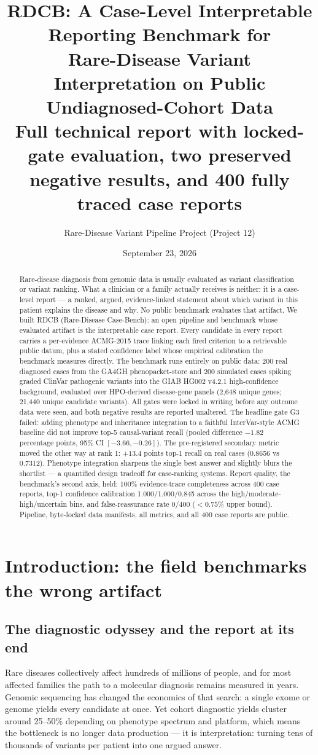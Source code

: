 \documentclass[11pt]{article}
\title{\textbf{RDCB: A Case-Level Interpretable Reporting Benchmark for\\Rare-Disease Variant Interpretation on Public Undiagnosed-Cohort Data}\\[0.4em]
\large Full technical report with locked-gate evaluation, two preserved negative results, and 400 fully traced case reports}
\author{Rare-Disease Variant Pipeline Project (Project 12)}
\date{September 23, 2026}
\begin{document}
\maketitle
\begin{abstract}
Rare-disease diagnosis from genomic data is usually evaluated as variant
classification or variant ranking. What a clinician or a family actually receives is
neither: it is a case-level report --- a ranked, argued, evidence-linked statement
about which variant in this patient explains the disease and why. No public benchmark
evaluates that artifact. We built RDCB (Rare-Disease Case-Bench): an open pipeline and
benchmark whose evaluated artifact is the interpretable case report. Every candidate
in every report carries a per-evidence ACMG-2015 trace linking each fired criterion to
a retrievable public datum, plus a stated confidence label whose empirical calibration
the benchmark measures directly. The benchmark runs entirely on public data: 200 real diagnosed cases from
the GA4GH phenopacket-store and 200 simulated cases spiking graded ClinVar pathogenic
variants into the GIAB HG002 v4.2.1 high-confidence background, evaluated over
HPO-derived disease-gene panels (2,648 unique genes; 21,440 unique candidate
variants). All gates were locked in writing before any outcome data were seen, and
both negative results are reported unaltered. The headline gate G3 failed: adding
phenotype and inheritance integration to a faithful InterVar-style ACMG baseline did
not improve top-5 causal-variant recall (pooled difference $-1.82$ percentage points,
95\% CI $[-3.66, -0.26]$). The pre-registered secondary metric moved the other way at
rank 1: $+13.4$ points top-1 recall on real cases (0.8656 vs 0.7312). Phenotype
integration sharpens the single best answer and slightly blurs the shortlist --- a
quantified design tradeoff for case-ranking systems. Report quality, the benchmark's
second axis, held: 100\% evidence-trace completeness across 400 case reports, top-1
confidence calibration 1.000/1.000/0.845 across the high/moderate-high/uncertain bins,
and false-reassurance rate $0/400$ ($<0.75\%$ upper bound). Pipeline, byte-locked data
manifests, all metrics, and all 400 case reports are public.
\end{abstract}
\tableofcontents
\newpage

\section{Introduction: the field benchmarks the wrong artifact}
\subsection{The diagnostic odyssey and the report at its end}
Rare diseases collectively affect hundreds of millions of people, and for most
affected families the path to a molecular diagnosis remains measured in years.
Genomic sequencing has changed the economics of that search: a single exome or genome
yields every candidate at once. Yet cohort diagnostic yields cluster around
25--50\% depending on phenotype spectrum and platform, which means the bottleneck is
no longer data production --- it is interpretation: turning tens of thousands of
variants per patient into one argued answer.
\end{document}
